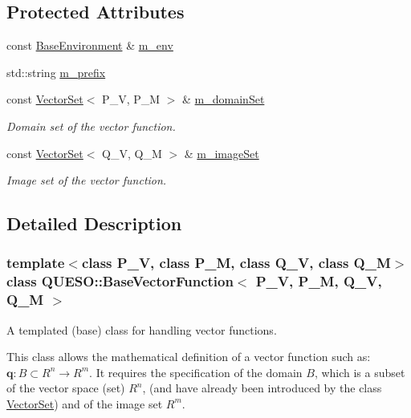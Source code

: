 \subsection*{Protected Attributes}
\begin{DoxyCompactItemize}
\item 
const \hyperlink{class_q_u_e_s_o_1_1_base_environment}{Base\-Environment} \& \hyperlink{class_q_u_e_s_o_1_1_base_vector_function_abb5487a1874515b698a3d5ee82490881}{m\-\_\-env}
\item 
std\-::string \hyperlink{class_q_u_e_s_o_1_1_base_vector_function_aacf92c70a9f6d0a951943aa708b7cfa6}{m\-\_\-prefix}
\item 
const \hyperlink{class_q_u_e_s_o_1_1_vector_set}{Vector\-Set}$<$ P\-\_\-\-V, P\-\_\-\-M $>$ \& \hyperlink{class_q_u_e_s_o_1_1_base_vector_function_a485d4d016534371775bb2b00b5a9f4d3}{m\-\_\-domain\-Set}
\begin{DoxyCompactList}\small\item\em Domain set of the vector function. \end{DoxyCompactList}\item 
const \hyperlink{class_q_u_e_s_o_1_1_vector_set}{Vector\-Set}$<$ Q\-\_\-\-V, Q\-\_\-\-M $>$ \& \hyperlink{class_q_u_e_s_o_1_1_base_vector_function_a442585224e86695e302757c0fad17913}{m\-\_\-image\-Set}
\begin{DoxyCompactList}\small\item\em Image set of the vector function. \end{DoxyCompactList}\end{DoxyCompactItemize}


\subsection{Detailed Description}
\subsubsection*{template$<$class P\-\_\-\-V, class P\-\_\-\-M, class Q\-\_\-\-V, class Q\-\_\-\-M$>$class Q\-U\-E\-S\-O\-::\-Base\-Vector\-Function$<$ P\-\_\-\-V, P\-\_\-\-M, Q\-\_\-\-V, Q\-\_\-\-M $>$}

A templated (base) class for handling vector functions. 

This class allows the mathematical definition of a vector function such as\-: $ \mathbf{q}: B \subset R^n \rightarrow R^m $. It requires the specification of the domain $ B $, which is a subset of the vector space (set) $ R^n $, (and have already been introduced by the class \hyperlink{class_q_u_e_s_o_1_1_vector_set}{Vector\-Set}) and of the image set $ R^m $. 

